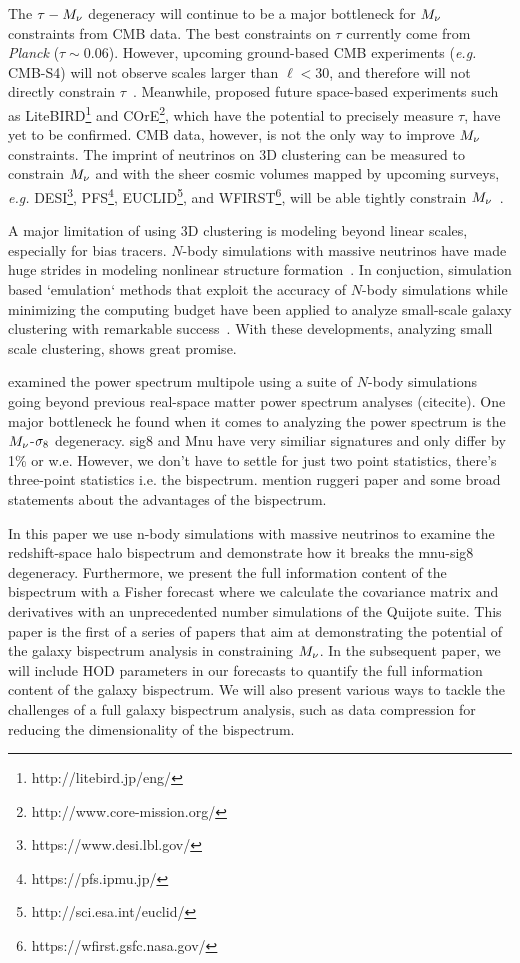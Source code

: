 The $\tau-M_\nu$ degeneracy will continue to be a major bottleneck 
for $M_\nu$ constraints from CMB data. The best constraints on $\tau$ 
currently come from {\em Planck} ($\tau\sim0.06$). However, upcoming 
ground-based CMB experiments ({\em e.g.} CMB-S4) will not observe scales 
larger than $\ell < 30$, and therefore will not directly constrain 
$\tau$~\citep{abazajian2016}. Meanwhile, proposed future space-based 
experiments such as LiteBIRD\footnote{http://litebird.jp/eng/} and 
COrE\footnote{http://www.core-mission.org/}, which have the potential 
to precisely measure $\tau$, have yet to be confirmed. CMB data, however, 
is not the only way to improve $M_\nu$ constraints. The imprint of 
neutrinos on 3D clustering can be measured to constrain $M_\nu$ and 
with the sheer cosmic volumes mapped by upcoming surveys, \emph{e.g.} 
DESI\footnote{https://www.desi.lbl.gov/}, PFS\footnote{https://pfs.ipmu.jp/}, 
EUCLID\footnote{http://sci.esa.int/euclid/}, and WFIRST\footnote{https://wfirst.gsfc.nasa.gov/}, 
will be able tightly constrain $M_\nu$~\citep{audren2013, font-ribera2014, petracca2016, sartoris2016, boyle2018}.

A major limitation of using 3D clustering is modeling beyond linear 
scales, especially for bias tracers. $N$-body simulations with massive 
neutrinos have made huge strides in modeling nonlinear structure 
formation~\citep{}. In conjuction, simulation based `emulation` methods
that exploit the accuracy of $N$-body simulations while minimizing the 
computing budget have been applied to analyze small-scale galaxy 
clustering with remarkable 
success~\citep[\emph{e.g.}][]{heitmann2009, kwan2015, euclidcollaboration2018, mcclintock2018, zhai2018, wibking2019}. 
With these developments, analyzing 
small scale clustering, shows great promise. 

\cite{villaescusa-navarro2018} examined the power spectrum multipole 
using a suite of $N$-body simulations going beyond previous real-space 
matter power spectrum analyses (citecite). One major bottleneck he 
found when it comes to analyzing the power spectrum is the $M_\nu$-$\sigma_8$ degeneracy. 
sig8 and Mnu have very similiar signatures and only differ by 1\% or w.e. 
However, we don't have to settle for just two point statistics, there's three-point 
statistics i.e. the bispectrum. mention ruggeri paper and some broad statements about
the advantages of the bispectrum. 

In this paper we use n-body simulations with massive neutrinos to examine the 
redshift-space halo bispectrum and demonstrate how it breaks the mnu-sig8 degeneracy. 
Furthermore, we present the full information content of the bispectrum with a Fisher 
forecast where we calculate the covariance matrix and derivatives with an unprecedented 
number simulations of the Quijote suite. This paper is the first of a series of 
papers that aim at demonstrating the potential of the galaxy bispectrum analysis in 
constraining $M_\nu$. In the subsequent paper, we will include HOD parameters in our 
forecasts to quantify the full information content of the galaxy bispectrum. We will
also present various ways to tackle the challenges of a full galaxy bispectrum analysis, 
such as data compression for reducing the dimensionality of the bispectrum. 

